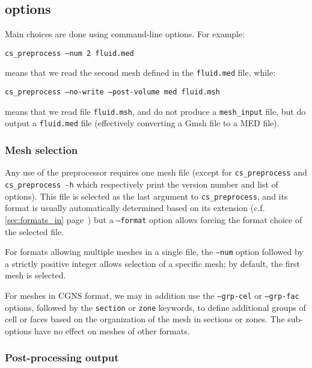 {{{{%
\subsection{\pcs options\label{sec:optpcs}}

Main choices are done using command-line options. For example:

\texttt{cs\_preprocess --num 2 fluid.med}

\noindent means that we read the second mesh defined in the
\texttt{fluid.med} file, while:

\texttt{cs\_preprocess --no-write --post-volume med fluid.msh}

\noindent means that we read file \texttt{fluid.msh}, and
do not produce a \texttt{mesh\_input}  file, but do output
a \texttt{fluid.med} file (effectively converting a Gmsh file to
a MED file).

\subsubsection{Mesh selection\label{sec:optpcs:mesh}}

Any use of the preprocessor requires one mesh file (except for
\texttt{cs\_preprocess} and \texttt{cs\_preprocess~-h} which respectively
print the version number and list of options).
This file is selected as the last argument to \texttt{cs\_preprocess},
and its format is usually automatically determined based on its
extension (c.f. \ref{sec:formats_in} page~\pageref{sec:formats_in})
but a \texttt{--format} option allows forcing the format choice of
the selected file.

For formats allowing multiple meshes in a single file, the
\texttt{--num} option followed by a strictly positive integer allows
selection of a specific mesh; by default, the first mesh is selected.

For meshes in CGNS format, we may in addition use the \texttt{--grp-cel}
or \texttt{--grp-fac} options, followed by the \texttt{section}
or \texttt{zone} keywords, to define additional groups of cell or faces
based on the organization of the mesh in sections or zones. The sub-options
have no effect on meshes of other formats.

\subsubsection{Post-processing output\label{sec:optpcs:post}}

}}}}
